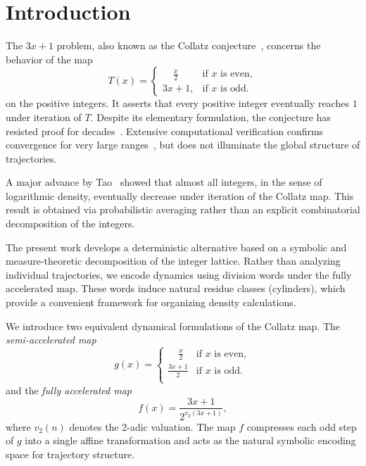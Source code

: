 \documentclass[12pt, oneside]{article}   	%
\numberwithin{equation}{section}          %
\theoremstyle{definition}
\begin{document}
\newpage
\tableofcontents
\newpage


\section{Introduction}

The $3x+1$ problem, also known as the Collatz conjecture~\cite{Collatz1937}, concerns
the behavior of the map
\[
T(x) =
\begin{cases}
\displaystyle
    \phantom{3x} \frac{x}{2} & \text {if } x \text{ is even}, \\[8pt]
\displaystyle
    3x+1,                    & \text{if $x$ is odd}.
\end{cases}
\]
on the positive integers. It asserts that every positive integer eventually reaches $1$
under iteration of $T$. Despite its elementary formulation, the conjecture has resisted
proof for decades~\cite{Lagarias2010,Terras1976}. Extensive computational verification
confirms convergence for very large ranges~\cite{OliveiraESilva2010}, but does not
illuminate the global structure of trajectories.

A major advance by Tao~\cite{Tao2019} showed that almost all integers, in the sense of
logarithmic density, eventually decrease under iteration of the Collatz map. This result
is obtained via probabilistic averaging rather than an explicit combinatorial
decomposition of the integers.

The present work develops a deterministic alternative based on a symbolic and measure-theoretic
decomposition of the integer lattice. Rather than analyzing individual trajectories, we encode
dynamics using division words under the fully accelerated map. These words induce natural residue
classes (cylinders), which provide a convenient framework for organizing density calculations.

We introduce two equivalent dynamical formulations of the Collatz map. The
\emph{semi-accelerated map}
\[
g(x) =
\begin{cases}
\displaystyle
    \phantom{3x} \frac{x}{2} & \text {if } x \text{ is even}, \\[8pt]
\displaystyle
    \frac{3x+1}{2}           & \text {if } x \text{ is odd}. \\
\end{cases}
\]
and the \emph{fully accelerated map}
\[
f(x)=\frac{3x+1}{2^{v_2(3x+1)}},
\]
where $v_2(n)$ denotes the 2-adic valuation. The map $f$ compresses each odd step of $g$
into a single affine transformation and acts as the natural symbolic encoding space for
trajectory structure.
\end{document}
